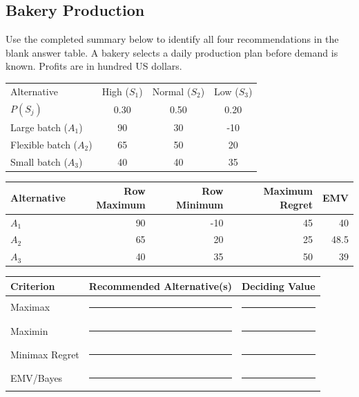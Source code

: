 \subsection{Bakery Production}\label{sec:c8-bakery}
Use the completed summary below to identify all four recommendations in the blank answer table.
A bakery selects a daily production plan before demand is known. Profits are in hundred US dollars.
\begin{center}
\begin{tabular}{lccc}\toprule
Alternative & High ($S_1$) & Normal ($S_2$) & Low ($S_3$)\\
$P(S_j)$ & 0.30 & 0.50 & 0.20\\\midrule
Large batch ($A_1$) & 90 & 30 & -10\\
Flexible batch ($A_2$) & 65 & 50 & 20\\
Small batch ($A_3$) & 40 & 40 & 35\\\bottomrule
\end{tabular}
\end{center}
\begin{center}
\begin{tabular}{lrrrr}\toprule
Alternative & Row Maximum & Row Minimum & Maximum Regret & EMV\\\midrule
$A_1$ & 90 & -10 & 45 & 40\\
$A_2$ & 65 & 20 & 25 & 48.5\\
$A_3$ & 40 & 35 & 50 & 39\\\bottomrule
\end{tabular}
\end{center}
\begin{center}
\begin{tabular}{lll}\toprule
Criterion & Recommended Alternative(s) & Deciding Value\\\midrule
Maximax & \rule{3cm}{0.4pt} & \rule{2cm}{0.4pt}\\
Maximin & \rule{3cm}{0.4pt} & \rule{2cm}{0.4pt}\\
Minimax Regret & \rule{3cm}{0.4pt} & \rule{2cm}{0.4pt}\\
EMV/Bayes & \rule{3cm}{0.4pt} & \rule{2cm}{0.4pt}\\\bottomrule
\end{tabular}
\end{center}


